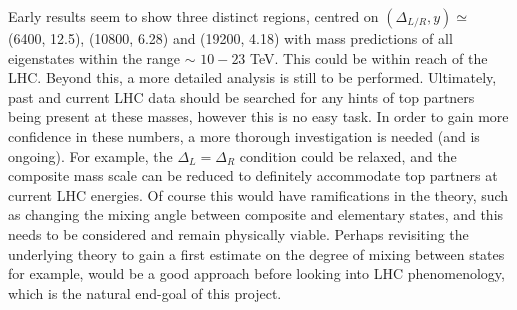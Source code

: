 \documentclass[a4paper]{article}
\begin{document}
\hfill\break
Early results seem to show three distinct regions, centred on \(\left(\Delta_{L/R}, y\right) \simeq\) (6400, 12.5), (10800, 6.28) and (19200, 4.18) with mass predictions of all eigenstates within the range \(\sim\) \(10-23\) TeV. This could be within reach of the LHC. Beyond this, a more detailed analysis is still to be performed. Ultimately, past and current LHC data should be searched for any hints of top partners being present at these masses, however this is no easy task. In order to gain more confidence in these numbers, a more thorough investigation is needed (and is ongoing). For example, the \(\Delta_{L} = \Delta_{R}\) condition could be relaxed, and the composite mass scale can be reduced to definitely accommodate top partners at current LHC energies. Of course this would have ramifications in the theory, such as changing the mixing angle between composite and elementary states, and this needs to be considered and remain physically viable. Perhaps revisiting the underlying theory to gain a first estimate on the degree of mixing between states for example, would be a good approach before looking into LHC phenomenology, which is the natural end-goal of this project.
\end{document}
